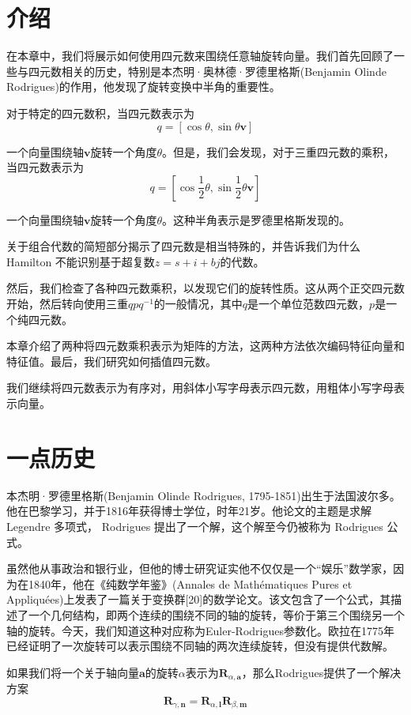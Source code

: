 \section{介绍}
在本章中，我们将展示如何使用四元数来围绕任意轴旋转向量。我们首先回顾了一些与四元数相关的历史，特别是本杰明·奥林德·罗德里格斯(Benjamin Olinde Rodrigues)的作用，他发现了旋转变换中半角的重要性。

对于特定的四元数积，当四元数表示为
$$
q=[\cos \theta, \sin \theta \mathbf{v}]
$$

一个向量围绕轴$\mathbf{v}$旋转一个角度$\theta$。但是，我们会发现，对于三重四元数的乘积，当四元数表示为
$$
q=\left[\cos \frac{1}{2} \theta, \sin \frac{1}{2} \theta \mathbf{v}\right]
$$

一个向量围绕轴$\mathbf{v}$旋转一个角度$\theta$。这种半角表示是罗德里格斯发现的。

关于组合代数的简短部分揭示了四元数是相当特殊的，并告诉我们为什么 Hamilton 不能识别基于超复数$z=s+ i+ bj $的代数。

然后，我们检查了各种四元数乘积，以发现它们的旋转性质。这从两个正交四元数开始，然后转向使用三重$q p q^{-1}$的一般情况，其中$q$是一个单位范数四元数，$p$是一个纯四元数。

本章介绍了两种将四元数乘积表示为矩阵的方法，这两种方法依次编码特征向量和特征值。最后，我们研究如何插值四元数。

我们继续将四元数表示为有序对，用斜体小写字母表示四元数，用粗体小写字母表示向量。

\section{一点历史}
本杰明·罗德里格斯(Benjamin Olinde Rodrigues, 1795-1851)出生于法国波尔多。他在巴黎学习，并于1816年获得博士学位，时年21岁。他论文的主题是求解 Legendre 多项式， Rodrigues 提出了一个解，这个解至今仍被称为 Rodrigues 公式。

虽然他从事政治和银行业，但他的博士研究证实他不仅仅是一个“娱乐”数学家，因为在1840年，他在《纯数学年鉴》(Annales de Mathématiques Pures et Appliquées)上发表了一篇关于变换群[20]的数学论文。该文包含了一个公式，其描述了一个几何结构，即两个连续的围绕不同的轴的旋转，等价于第三个围绕另一个轴的旋转。今天，我们知道这种对应称为Euler-Rodrigues参数化。欧拉在1775年已经证明了一次旋转可以表示围绕不同轴的两次连续旋转，但没有提供代数解。

如果我们将一个关于轴向量$\mathbf{a}$的旋转$\alpha$表示为$\mathbf{R}_{\alpha, \mathbf{a}}$，那么Rodrigues提供了一个解决方案
$$
\mathbf{R}_{\gamma, \mathbf{n}}=\mathbf{R}_{\alpha, \mathbf{l}} \mathbf{R}_{\beta, \mathbf{m}}
$$

